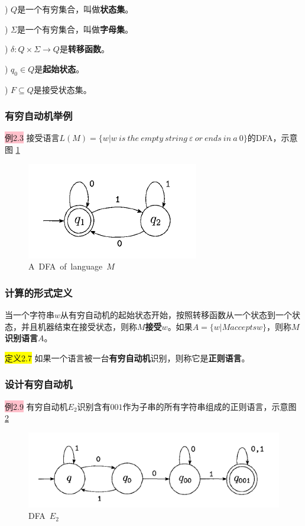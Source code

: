 \documentclass[a4paper]{article}
\begin{document}
	) $Q$是一个有穷集合，叫做\textbf{状态集}。
	
	) $\Sigma$是一个有穷集合，叫做\textbf{字母集}。
	
	) $\delta: Q \times \Sigma \rightarrow Q$是\textbf{转移函数}。
	
	) $q_0 \in Q$是\textbf{起始状态}。
	
	) $F \subseteq Q$是接受状态集。
	
\subsubsection{有穷自动机举例}
	
	\colorbox{pink}{例2.3} 接受语言$L(M)=\{w|w~is~the~empty~string~\varepsilon~or~ends~in~a~0\}$的DFA，示意图 \ref{F020102}

	\begin{figure}[htb]
		\centering
		\includegraphics[scale=0.8]{./figure/2.1.2.png}
		\caption{A~DFA~of~language~$M$}
		\label{F020102}
	\end{figure}

\subsubsection{计算的形式定义}

	当一个字符串$w$从有穷自动机的起始状态开始，按照转移函数从一个状态到一个状态，并且机器结束在接受状态，则称\textbf{$M$接受$w$}。如果$A=\{w|M accepts w\}$，则称\textbf{$M$识别语言$A$}。

	\colorbox{yellow}{定义2.7} 如果一个语言被一台\textbf{有穷自动机}识别，则称它是\textbf{正则语言}。

\subsubsection{设计有穷自动机}

	\colorbox{pink}{例2.9} 有穷自动机$E_2$识别含有$001$作为子串的所有字符串组成的正则语言，示意图 \ref{F020104}

	\begin{figure}[htb]
		\centering
		\includegraphics[scale=0.8]{./figure/2.1.4.png}
		\caption{DFA~$E_2$}
		\label{F020104}
	\end{figure}
	
\end{document}
